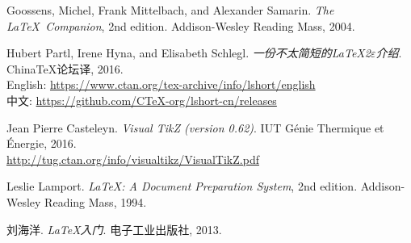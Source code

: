 \begin{thebibliography}{9}

 Goossens, Michel, Frank Mittelbach, and Alexander Samarin.
  \newblock \emph{The \LaTeX\ Companion}, 2nd edition.
  \newblock Addison-Wesley Reading Mass, 2004.

 Hubert Partl, Irene Hyna, and Elisabeth Schlegl.
  \newblock \emph{一份不太简短的\LaTeX 2$\varepsilon$介绍}.
  \newblock China\TeX 论坛译, 2016. \\
  English: \url{https://www.ctan.org/tex-archive/info/lshort/english}\\
  中文: \url{https://github.com/CTeX-org/lshort-cn/releases}
  
 Jean Pierre Casteleyn.
  \newblock \emph{Visual TikZ (version 0.62)}.
  \newblock IUT Génie Thermique et Énergie, 2016. \\
  \url{http://tug.ctan.org/info/visualtikz/VisualTikZ.pdf}
      
 Leslie Lamport.
  \newblock \emph{\LaTeX: A Document Preparation System}, 2nd edition.
  \newblock Addison-Wesley Reading Mass, 1994.
  
 刘海洋.
  \newblock \emph{\LaTeX 入门}.
  \newblock 电子工业出版社, 2013.

\end{thebibliography}

\endinput
